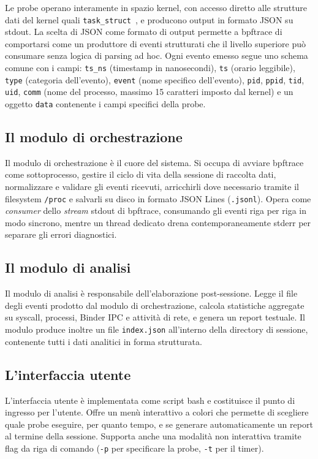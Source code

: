 Le probe operano interamente in spazio kernel, con accesso diretto alle strutture dati del kernel quali \texttt{task\_struct}~\cite{linux_task_struct}, e producono output in formato JSON su stdout. La scelta di JSON come formato di output permette a bpftrace di comportarsi come un produttore di eventi strutturati che il livello superiore può consumare senza logica di parsing ad hoc. Ogni evento emesso segue uno schema comune con i campi: \texttt{ts\_ns} (timestamp in nanosecondi), \texttt{ts} (orario leggibile), \texttt{type} (categoria dell'evento), \texttt{event} (nome specifico dell'evento), \texttt{pid}, \texttt{ppid}, \texttt{tid}, \texttt{uid}, \texttt{comm} (nome del processo, massimo 15 caratteri imposto dal kernel) e un oggetto \texttt{data} contenente i campi specifici della probe.

\subsection{Il modulo di orchestrazione}

Il modulo di orchestrazione è il cuore del sistema. Si occupa di avviare bpftrace come sottoprocesso, gestire il ciclo di vita della sessione di raccolta dati, normalizzare e validare gli eventi ricevuti, arricchirli dove necessario tramite il filesystem \texttt{/proc} e salvarli su disco in formato JSON Lines (\texttt{.jsonl}). Opera come \textit{consumer} dello \textit{stream} stdout di bpftrace, consumando gli eventi riga per riga in modo sincrono, mentre un thread dedicato drena contemporaneamente stderr per separare gli errori diagnostici.

\subsection{Il modulo di analisi}

Il modulo di analisi è responsabile dell'elaborazione post-sessione. Legge il file degli eventi prodotto dal modulo di orchestrazione, calcola statistiche aggregate su syscall, processi, Binder IPC e attività di rete, e genera un report testuale. Il modulo produce inoltre un file \texttt{index.json} all'interno della directory di sessione, contenente tutti i dati analitici in forma strutturata.

\subsection{L'interfaccia utente}

L'interfaccia utente è implementata come script bash e costituisce il punto di ingresso per l'utente. Offre un menù interattivo a colori che permette di scegliere quale probe eseguire, per quanto tempo, e se generare automaticamente un report al termine della sessione. Supporta anche una modalità non interattiva tramite flag da riga di comando (\texttt{-p} per specificare la probe, \texttt{-t} per il timer).

